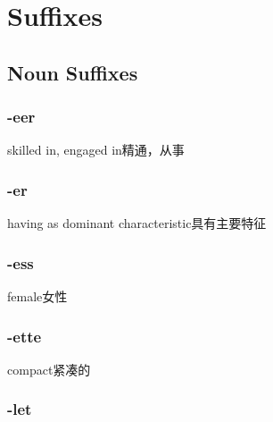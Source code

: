 \chapter{Suffixes}

\section{Noun Suffixes}

\subsection{-eer}

\begin{nlist}{skilled in, engaged in}{精通，从事}
\end{nlist}

\subsection{-er}

\begin{nlist}{having as dominant characteristic}{具有主要特征}
\end{nlist}

\subsection{-ess}

\begin{nlist}{female}{女性}
\end{nlist}

\subsection{-ette}

\begin{nlist}{compact}{紧凑的}
\end{nlist}

\subsection{-let}

